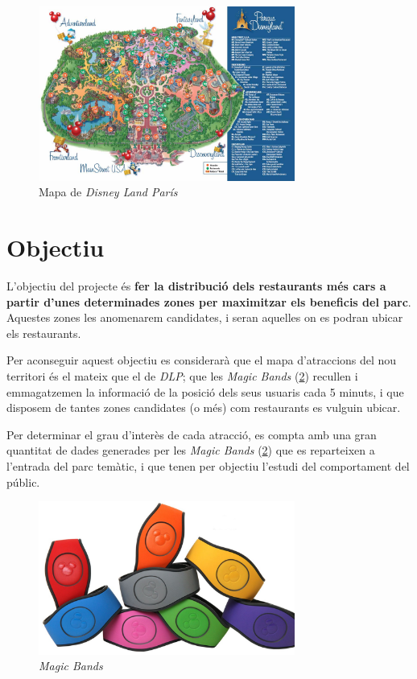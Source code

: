 \documentclass[12pt]{article}
\begin{document}
\begin{figure}[H]
    \centering
    \includegraphics[width=0.75\textwidth]{imatges/mapa_disney_land_paris.jpg}\par\vspace{1cm}
    \caption{Mapa de \textit{Disney Land París}}
    \label{fig:disney1}
\end{figure}

\clearpage
\section{Objectiu}
L'objectiu del projecte és \textbf{fer la distribució dels restaurants més cars a partir d'unes determinades zones  per maximitzar els beneficis del parc}. Aquestes zones les anomenarem candidates, i seran aquelles on es podran ubicar els restaurants.

Per aconseguir aquest objectiu es considerarà que el mapa d'atraccions del nou territori és el mateix que el de \textit{DLP}; que les \textit{Magic Bands} (\ref{fig:magic_bands}) recullen i emmagatzemen la informació de la posició dels seus usuaris cada 5 minuts, i que disposem de tantes zones candidates (o més) com restaurants es vulguin ubicar. 

Per determinar el grau d'interès de cada atracció, es compta amb una gran quantitat de dades generades per les \textit{Magic Bands} (\ref{fig:magic_bands}) que es reparteixen a l'entrada del parc temàtic, i que tenen per objectiu l'estudi del comportament del públic. 

\begin{figure}[H]
    \centering
    \includegraphics[width=0.75\textwidth]{imatges/magic_bands.jpg}\par\vspace{1cm}
    \caption{\textit{Magic Bands}}
    \label{fig:magic_bands}
\end{figure}
\end{document}
